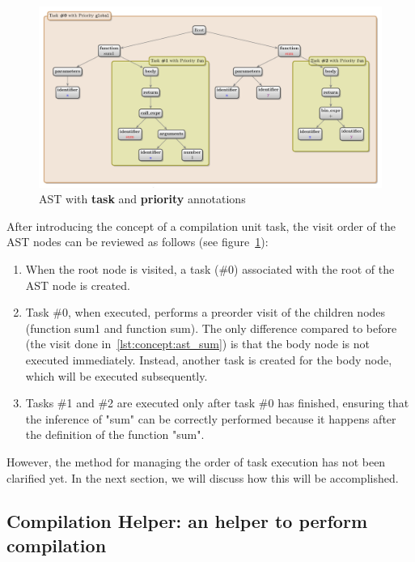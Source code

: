 \begin{figure}[t]
    \centering
    \includegraphics[width=0.9\linewidth]{figs/concept/simple_ast_annotated.pdf}
    \caption{AST with \textbf{task} and \textbf{priority} annotations}
    \label{lst:concept:ast_sum_annotated}
\end{figure}

After introducing the concept of a compilation unit task, the visit order of the AST nodes can be reviewed as follows (see figure~\ref{lst:concept:ast_sum_annotated}):

\begin{enumerate}
    \item When the root node is visited, a task (\#0) associated with the root of the AST node is created.
    \item Task \#0, when executed, performs a preorder visit of the children nodes (function sum1 and function sum). The only difference compared to before (the visit done in~\ref{lst:concept:ast_sum}) is that the body node is not executed immediately. Instead, another task is created for the body node, which will be executed subsequently.
    \item Tasks \#1 and \#2 are executed only after task \#0 has finished, ensuring that the inference of "sum" can be correctly performed because it happens after the definition of the function "sum".
\end{enumerate}

However, the method for managing the order of task execution has not been clarified yet. In the next section, we will discuss how this will be accomplished.

\subsection{Compilation Helper: an helper to perform compilation}\label{subsec:concept:CompilationHelperAnHelperToPerformCompilation}


